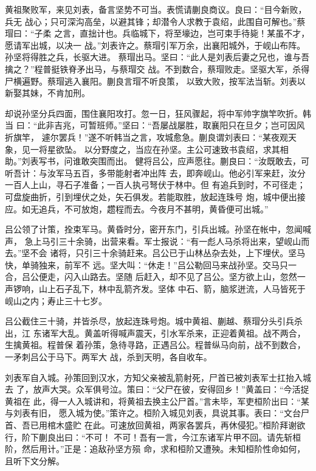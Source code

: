 黄祖聚败军，来见刘表，备言坚势不可当。表慌请蒯良商议。良曰：“目今新败，兵无
战心；只可深沟高垒，以避其锋；却潜令人求教于袁绍，此围自可解也。”蔡瑁曰：“子柔
之言，直拙计也。兵临城下，将至壕边，岂可束手待毙！某虽不才，愿请军出城，以决一
战。”刘表许之。蔡瑁引军万余，出襄阳城外，于岘山布阵。孙坚将得胜之兵，长驱大进。
蔡瑁出马。坚曰：“此人是刘表后妻之兄也，谁与吾擒之？”程普挺铁脊矛出马，与蔡瑁交
战。不到数合，蔡瑁败走。坚驱大军，杀得尸横遍野。蔡瑁逃入襄阳。蒯良言瑁不听良策，
以致大败，按军法当斩。刘表以新娶其妹，不肯加刑。

却说孙坚分兵四面，围住襄阳攻打。忽一日，狂风骤起，将中军帅字旗竿吹折。韩当
曰：“此非吉兆，可暂班师。”坚曰：“吾屡战屡胜，取襄阳只在旦夕；岂可因风折旗竿，
遽尔罢兵！”遂不听韩当之言，攻城愈急。蒯良谓刘表曰：“某夜观天象，见一将星欲坠。
以分野度之，当应在孙坚。主公可速致书袁绍，求其相助。”刘表写书，问谁敢突围而出。
健将吕公，应声愿往。蒯良曰：“汝既敢去，可听吾计：与汝军马五百，多带能射者冲出阵
去，即奔岘山。他必引军来赶，汝分一百人上山，寻石子准备；一百人执弓弩伏于林中。但
有追兵到时，不可径走；可盘旋曲折，引到埋伏之处，矢石俱发。若能取胜，放起连珠号
炮，城中便出接应。如无追兵，不可放炮，趱程而去。今夜月不甚明，黄昏便可出城。”

吕公领了计策，拴束军马。黄昏时分，密开东门，引兵出城。孙坚在帐中，忽闻喊声，
急上马引三十余骑，出营来看。军士报说：“有一彪人马杀将出来，望岘山而去。”坚不会
诸将，只引三十余骑赶来。吕公已于山林丛杂去处，上下埋伏。坚马快，单骑独来，前军不
远。坚大叫：“休走！”吕公勒回马来战孙坚。交马只一合，吕公便走，闪入山路去。坚随
后赶入，却不见了吕公。坚方欲上山，忽然一声锣响，山上石子乱下，林中乱箭齐发。坚体
中石、箭，脑浆迸流，人马皆死于岘山之内；寿止三十七岁。

吕公截住三十骑，并皆杀尽，放起连珠号炮。城中黄祖、蒯越、蔡瑁分头引兵杀出，江
东诸军大乱。黄盖听得喊声震天，引水军杀来，正迎着黄祖。战不两合，生擒黄祖。程普保
着孙策，急待寻路，正遇吕公。程普纵马向前，战不到数合，一矛刺吕公于马下。两军大
战，杀到天明，各自收车。

刘表军自入城。孙策回到汉水，方知父亲被乱箭射死，尸首已被刘表军士扛抬入城去
了，放声大哭。众军俱号泣。策曰：“父尸在彼，安得回乡！”黄盖曰：“今活捉黄祖在
此，得一人入城讲和，将黄祖去换主公尸首。”言未毕，军吏桓阶出曰：“某与刘表有旧，
愿入城为使。”策许之。桓阶入城见刘表，具说其事。表曰：“文台尸首、吾已用棺木盛贮
在此。可速放回黄祖，两家各罢兵，再休侵犯。”桓阶拜谢欲行，阶下蒯良出曰：“不可！
不可！吾有一言，今江东诸军片甲不回。请先斩桓阶，然后用计。”正是：追敌孙坚方殒
命，求和桓阶又遭殃。未知桓阶性命如何，且听下文分解。